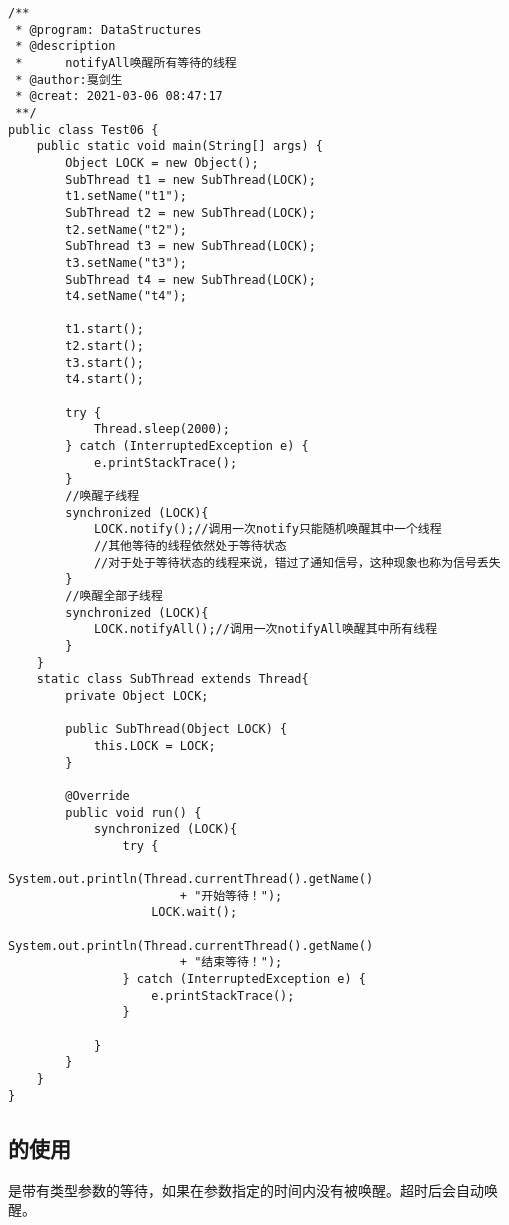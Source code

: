 \documentclass[a4paper]{report}
\begin{document}
\begin{Verbatim}[frame=single,numbersep=5pt,xleftmargin=1.5em,xrightmargin=1.5em]
/**
 * @program: DataStructures
 * @description
 *      notifyAll唤醒所有等待的线程
 * @author:戛剑生
 * @creat: 2021-03-06 08:47:17
 **/
public class Test06 {
    public static void main(String[] args) {
        Object LOCK = new Object();
        SubThread t1 = new SubThread(LOCK);
        t1.setName("t1");
        SubThread t2 = new SubThread(LOCK);
        t2.setName("t2");
        SubThread t3 = new SubThread(LOCK);
        t3.setName("t3");
        SubThread t4 = new SubThread(LOCK);
        t4.setName("t4");

        t1.start();
        t2.start();
        t3.start();
        t4.start();

        try {
            Thread.sleep(2000);
        } catch (InterruptedException e) {
            e.printStackTrace();
        }
        //唤醒子线程
        synchronized (LOCK){
            LOCK.notify();//调用一次notify只能随机唤醒其中一个线程
            //其他等待的线程依然处于等待状态
            //对于处于等待状态的线程来说，错过了通知信号，这种现象也称为信号丢失
        }
        //唤醒全部子线程
        synchronized (LOCK){
            LOCK.notifyAll();//调用一次notifyAll唤醒其中所有线程
        }
    }
    static class SubThread extends Thread{
        private Object LOCK;

        public SubThread(Object LOCK) {
            this.LOCK = LOCK;
        }

        @Override
        public void run() {
            synchronized (LOCK){
                try {
                    System.out.println(Thread.currentThread().getName()
                        + "开始等待！");
                    LOCK.wait();
                    System.out.println(Thread.currentThread().getName()
                        + "结束等待！");
                } catch (InterruptedException e) {
                    e.printStackTrace();
                }

            }
        }
    }
}\end{Verbatim}
\subsection{的使用}
是带有类型参数的等待，如果在参数指定的时间内没有被唤醒。超时后会自动唤醒。
\end{document}

